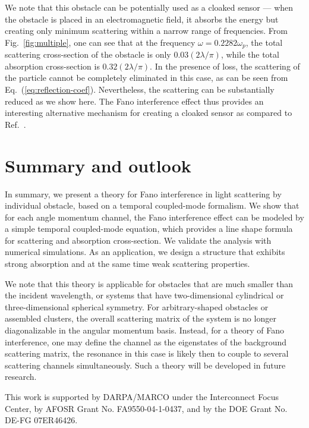 \documentclass[preprint,aps]{revtex4}
\begin{document}
We note that this obstacle can be potentially used as a cloaked
sensor \cite{alu2009cloaking}--- when the obstacle is placed in an
electromagnetic field, it absorbs the energy but creating only
minimum scattering within a narrow range of frequencies. From
Fig.~\ref{fig:multiple}, one can see that at the frequency
$\omega=0.2282\omega_p$, the total scattering cross-section of the
obstacle is only $0.03(2\lambda/\pi)$, while the total absorption
cross-section is $0.32(2\lambda/\pi)$.  In the presence of loss, the
scattering of the particle cannot be completely eliminated in this
case, as can be seen from Eq.~(\ref{eq:reflection-coef}).
Nevertheless, the scattering can be substantially reduced as we show
here. The Fano interference effect thus provides an interesting
alternative mechanism for creating a cloaked sensor as compared to
Ref.~\cite{alu2009cloaking}.

\section{Summary and outlook}

In summary, we present a theory for Fano interference in light
scattering by individual obstacle, based on a temporal coupled-mode
formalism. We show that for each angle momentum channel, the Fano
interference effect can be modeled by a simple temporal coupled-mode
equation, which provides a line shape formula for scattering  and
absorption cross-section. We validate the analysis with numerical
simulations. As an application, we design a structure that exhibits
strong absorption and at the same time weak scattering properties.

We note that this theory is applicable for obstacles that are much
smaller than the incident wavelength, or systems that have
two-dimensional cylindrical or  three-dimensional spherical
symmetry. For arbitrary-shaped obstacles or assembled clusters, the
overall scattering matrix of the system is no longer diagonalizable
in the angular momentum basis. Instead, for a theory of Fano
interference, one may define the channel as the eigenstates of the
background scattering matrix, the resonance in this case is likely
then to couple to several scattering channels simultaneously. Such a
theory will be developed in future research.

This work is supported by DARPA/MARCO under the Interconnect Focus
Center, by AFOSR Grant No. FA9550-04-1-0437, and by the DOE Grant
No. DE-FG 07ER46426.

%
\end{document}

